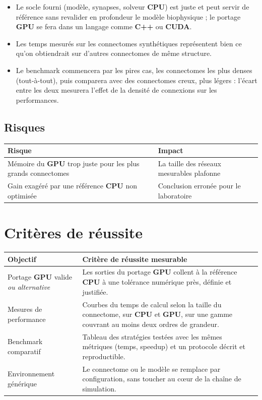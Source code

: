 \documentclass{report}
\begin{document}
\begin{itemize}
    \item Le socle fourni (modèle, synapses, solveur \textbf{CPU}) est juste et peut servir de référence sans revalider en profondeur le modèle biophysique ; le portage \textbf{GPU} se fera dans un langage comme \textbf{C++} ou \textbf{CUDA}.
    \item Les temps mesurés sur les connectomes synthétiques représentent bien ce qu'on obtiendrait sur d'autres connectomes de même structure.
    \item Le benchmark commencera par les pires cas, les connectomes les plus denses (tout-à-tout), puis comparera avec des connectomes creux, plus légers : l'écart entre les deux mesurera l'effet de la densité de connexions sur les performances.
\end{itemize}

\section{Risques}

\begin{longtable}{|p{6.8cm}|p{7.8cm}|}
\hline
\textbf{Risque} & \textbf{Impact} \\ \hline
Mémoire du \textbf{GPU} trop juste pour les plus grands connectomes &
La taille des réseaux mesurables plafonne \\ \hline

Gain exagéré par une référence \textbf{CPU} non optimisée &
Conclusion erronée pour le laboratoire \\ \hline

\end{longtable}

\chapter{Critères de réussite}

\begin{longtable}{|p{5.5cm}|p{9.5cm}|}
\hline
\textbf{Objectif} & \textbf{Critère de réussite mesurable} \\ \hline

Portage \textbf{GPU} valide \textit{ou alternative} &
Les sorties du portage \textbf{GPU} collent à la référence \textbf{CPU} à une tolérance numérique près, définie et justifiée. \\ \hline

Mesures de performance &
Courbes du temps de calcul selon la taille du connectome, sur \textbf{CPU} et \textbf{GPU}, sur une gamme couvrant au moins deux ordres de grandeur. \\ \hline

Benchmark comparatif &
Tableau des stratégies testées avec les mêmes métriques (temps, speedup) et un protocole décrit et reproductible. \\ \hline

Environnement générique &
Le connectome ou le modèle se remplace par configuration, sans toucher au cœur de la chaîne de simulation. \\ \hline

\end{longtable}
\end{document}
